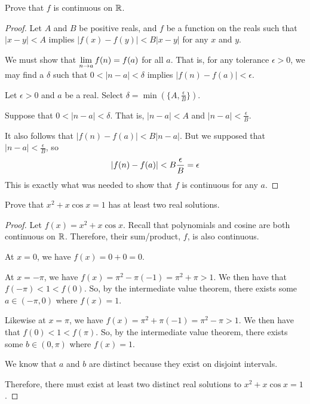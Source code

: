 \documentclass{agony}
\begin{document}
Prove that $f$ is continuous on $\mathbb{R}$.
\begin{proof}
  Let $A$ and $B$ be positive reals, and $f$ be a function on the reals such that
  $|x-y| < A$ implies $|f(x)-f(y)| < B|x-y|$ for any $x$ and $y$.

  We must show that $\lim\limits_{n\to a}f(n)=f(a)$ for all $a$.
  That is, for any tolerance $\epsilon > 0$,
  we may find a $\delta$ such that $0 < |n-a| < \delta$ implies $|f(n)-f(a)| < \epsilon$.

  Let $\epsilon > 0$ and $a$ be a real. Select $\delta = \min(\{A,\frac{\epsilon}{B}\})$.

  Suppose that $0 < |n-a| < \delta$.
  That is, $|n-a| < A$ and $|n-a| < \frac{\epsilon}{B}$.

  It also follows that $|f(n)-f(a)| < B|n-a|$.
  But we supposed that $|n-a| < \frac{\epsilon}{B}$, so
  \[ \abs{f(n)-f(a)} < B\frac{\epsilon}{B} = \epsilon \]
  This is exactly what was needed to show that $f$ is continuous for any $a$.
\end{proof}

\question Prove that $x^2+x\cos x = 1$ has at least two real solutions.
\begin{proof}
  Let $f(x) = x^2+x\cos x$.
  Recall that polynomials and cosine are both continuous on $\mathbb{R}$.
  Therefore, their sum/product, $f$, is also continuous.

  At $x=0$, we have $f(x)=0+0=0$.

  At $x=-\pi$, we have $f(x)=\pi^2-\pi(-1)=\pi^2+\pi > 1$.
  We then have that $f(-\pi) < 1 < f(0)$.
  So, by the intermediate value theorem, there exists some $a\in(-\pi,0)$ where $f(x)=1$.

  Likewise at $x=\pi$, we have $f(x)=\pi^2+\pi(-1)=\pi^2-\pi > 1$.
  We then have that $f(0) < 1 < f(\pi)$.
  So, by the intermediate value theorem, there exists some $b\in(0,\pi)$ where $f(x)=1$.

  We know that $a$ and $b$ are distinct because they exist on disjoint intervals.

  Therefore, there must exist at least two distinct real solutions to $x^2+x\cos x=1$.
\end{proof}
\end{document}
